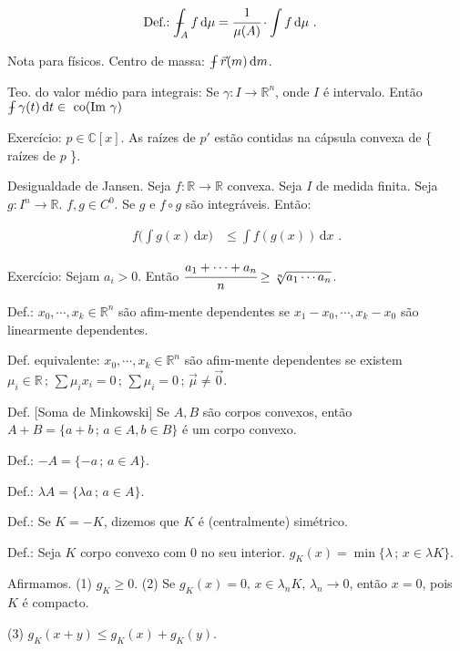 \documentclass[12pt]{article}
\def\Xint#1{\mathchoice
{\XXint\displaystyle\textstyle{#1}}%
{\XXint\textstyle\scriptstyle{#1}}%
{\XXint\scriptstyle\scriptscriptstyle{#1}}%
{\XXint\scriptscriptstyle\scriptscriptstyle{#1}}%
\!\int}
\def\XXint#1#2#3{{\setbox0=\hbox{$#1{#2#3}{\int}$ }
\vcenter{\hbox{$#2#3$ }}\kern-.6\wd0}}
\def\dashint{\Xint-}
\begin{document}
\begin{align}
\text{Def.: }\dashint_A f \,\mathrm{d}\mu &= \cfrac{1}{\mu(A)}\cdot\int f\,\mathrm{d}\mu\,\,.
\end{align}

Nota para f\'isicos. Centro de massa: $\dashint \vec r(m) \,\mathrm{d}m$.

Teo. do valor m\'edio para integrais: Se $\gamma : I \to \mathbb{R}^n$, onde $I$ \'e intervalo. Ent\~ao $\dashint \gamma(t)\,\mathrm{d}t \in \text{ co}(\text{Im }\gamma)$

Exerc\'icio: $p \in \mathbb{C}[x]$. As ra\'izes de $p'$ est\~ao contidas na c\'apsula convexa de \{ ra\'izes de $p$ \}.

\vspace{100mm}

Desigualdade de Jansen. Seja $f : \mathbb{R} \to \mathbb{R}$ convexa. Seja $I$ de medida finita. Seja $g : I^n \to \mathbb{R}$. $f, g \in C^0$. Se $g$ e $f \circ g$ s\~ao integr\'aveis. Ent\~ao:

\begin{align}
f\bigg( \int g(x)\,\mathrm{d}x \bigg) &\le \int f(g(x))\,\mathrm{d}x\,\,.
\end{align}

Exerc\'icio: Sejam $a_i > 0$. Ent\~ao $\cfrac{a_1 + \cdots + a_n}{n} \ge \sqrt[n]{a_1\cdots a_n}$.

Def.: $x_0, \cdots, x_k \in \mathbb{R}^n$ s\~ao afim-mente dependentes se $x_1 - x_0, \cdots, x_k - x_0$ s\~ao linearmente dependentes.

Def. equivalente: $x_0, \cdots, x_k \in \mathbb{R}^n$ s\~ao afim-mente dependentes se existem $\mu_i \in \mathbb{R}\,;\,\sum \mu_i x_i = 0\,;\,\sum \mu_i = 0\,;\,\vec \mu \ne \vec 0$.

Def. [Soma de Minkowski] Se $A, B$ s\~ao corpos convexos, ent\~ao $A + B = \{ a + b \,;\, a \in A, b \in B \} $ \'e um corpo convexo.

Def.: $-A = \{ -a\,;\, a \in A\}$.

Def.: $\lambda A = \{ \lambda a\,;\, a \in A\}$.

Def.: Se $K = -K$, dizemos que $K$ \'e (centralmente) sim\'etrico.

Def.: Seja $K$ corpo convexo com $0$ no seu interior. $g_K(x) = \min\{ \lambda\,;\,x \in \lambda K\}$.

Afirmamos. (1) $g_K \ge 0$. (2) Se $g_K(x) = 0,\,x\in \lambda_n K,\,\lambda_n \to 0$, ent\~ao $x = 0$, pois $K$ \'e compacto.

(3) $g_K(x + y) \le g_K(x) + g_K(y)$.
\end{document}
